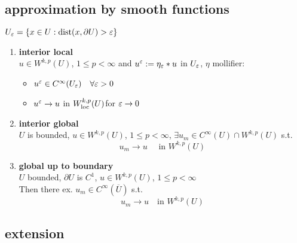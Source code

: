 \subsection{approximation by smooth functions}

$U_\varepsilon = \{x \in U: \text{dist}(x,\partial U ) > \varepsilon \}$

\begin{enumerate}[label=(\alph*)]
	\item \textbf{interior local}\\
	$u \in W^{k,p}(U)$, $1 \leq p < \infty$ and $u^{\varepsilon}:= \eta_{\varepsilon} * u$ in $U_{\varepsilon}$, $\eta$ mollifier:
	\begin{itemize}
		\item $u^\varepsilon \in C^\infty(U_\varepsilon) \quad \forall \varepsilon >0$
		\item $u^\varepsilon \to u$ in $W^{k,p}_{\text{loc}}(U)$\quad for $\varepsilon \to 0$
	\end{itemize}

	\item \textbf{interior global}\\
	$U$ is bounded, $u \in W^{k,p}(U)$, $1\leq p < \infty $, $\exists u_m \in C^\infty(U) \cap W^{k,p}(U)$ s.t.
	\begin{equation*}
		u_m \to u \quad \text{ in } W^{k,p}(U)
	\end{equation*} 
	
	\item \textbf{global up to boundary}\\
	$U$ bounded, $\partial U $ is $C^1$, $u \in W^{k,p}(U)$, $1 \leq p < \infty$\\
	Then there ex. $u_m \in C^\infty(\overline{U})$ s.t. 
	\begin{equation*}
		u_m \to u \quad \text{in } W^{k,p}(U)
	\end{equation*}
	
	
\end{enumerate}

\subsection{extension}

\begin{enumerate}[label=(\alph*)]
	
\end{enumerate}